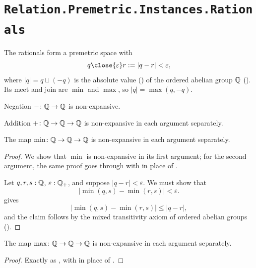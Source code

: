 \section{\texttt{Relation.Premetric.Instances.Rationals}}

\begin{definition}
  \label{QPremetricSpace}
  The rationals form a premetric space with
  \[
    q \close{\varepsilon} r := \lvert q - r \rvert < \varepsilon,
  \]
  where $\lvert q \rvert = q \sqcup (-q)$ is the absolute value () of the ordered abelian group $\mathbb{Q}$ (). Its meet and join are $\min$ and $\max$, so $\lvert q \rvert = \max(q, -q)$.
\end{definition}

\begin{lemma}[\agda{-ⁿ}]
  \label{negN}
  Negation $- \colon \mathbb{Q} \to \mathbb{Q}$ is non-expansive.
\end{lemma}

\begin{lemma}[\agda{+ⁿ}]
  \label{plusN}
  Addition $+ \colon \mathbb{Q} \to \mathbb{Q} \to \mathbb{Q}$ is non-expansive in each argument separately.
\end{lemma}

\begin{lemma}
  \label{minNE2}
  The map $\min \colon \mathbb{Q} \to \mathbb{Q} \to \mathbb{Q}$ is non-expansive in each argument separately.
\end{lemma}
\begin{proof}
  We show that $\min$ is non-expansive in its first argument; for the second argument, the same proof goes through with  in place of .

  Let $q, r, s : \mathbb{Q}$, $\varepsilon : \mathbb{Q}_{+}$, and suppose $\lvert q - r \rvert < \varepsilon$. We must show that
  \[
    \lvert \min(q, s) - \min(r, s) \rvert < \varepsilon.
  \]
   gives
  \[
    \lvert \min(q, s) - \min(r, s) \rvert \le \lvert q - r \rvert,
  \]
  and the claim follows by the mixed transitivity axiom of ordered abelian groups ().
\end{proof}

\begin{lemma}
  \label{maxNE2}
  The map $\max \colon \mathbb{Q} \to \mathbb{Q} \to \mathbb{Q}$ is non-expansive in each argument separately.
\end{lemma}
\begin{proof}
  Exactly as , with  in place of .
\end{proof}
